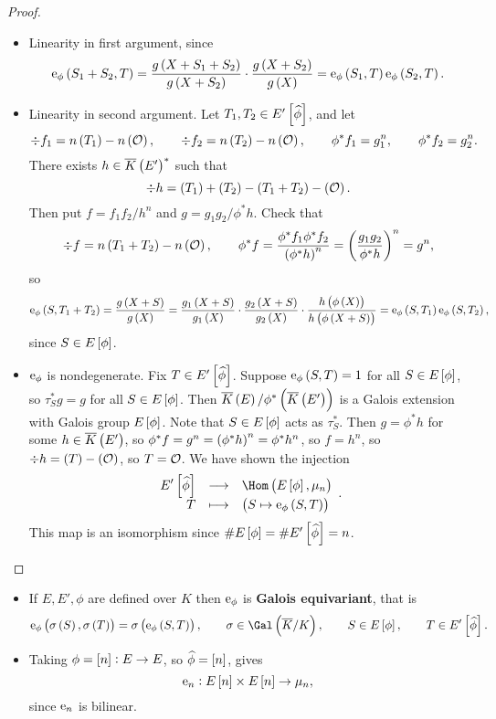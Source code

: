 \begin{proof}
\hfill
\begin{itemize}
\item Linearity in first argument, since
$$ \e_\phi\br{S_1 + S_2, T} = \dfrac{g\br{X + S_1 + S_2}}{g\br{X + S_2}} \cdot \dfrac{g\br{X + S_2}}{g\br{X}} = \e_\phi\br{S_1, T}\e_\phi\br{S_2, T}. $$

\pagebreak

\item Linearity in second argument. Let $ T_1, T_2 \in E'\sbr{\widehat{\phi}} $, and let
$$ \div f_1 = n\br{T_1} - n\br{\OOO}, \qquad \div f_2 = n\br{T_2} - n\br{\OOO}, \qquad \phi^*f_1 = g_1^n, \qquad \phi^*f_2 = g_2^n. $$
There exists $ h \in \overline{K}\br{E'}^* $ such that
$$ \div h = \br{T_1} + \br{T_2} - \br{T_1 + T_2} - \br{\OOO}. $$
Then put $ f = f_1f_2 / h^n $ and $ g = g_1g_2 / \phi^*h $. Check that
$$ \div f = n\br{T_1 + T_2} - n\br{\OOO}, \qquad \phi^*f = \dfrac{\phi^*f_1\phi^*f_2}{\br{\phi^*h}^n} = \br{\dfrac{g_1g_2}{\phi^*h}}^n = g^n, $$
so
$$ \e_\phi\br{S, T_1 + T_2} = \dfrac{g\br{X + S}}{g\br{X}} = \dfrac{g_1\br{X + S}}{g_1\br{X}} \cdot \dfrac{g_2\br{X + S}}{g_2\br{X}} \cdot \dfrac{h\br{\phi\br{X}}}{h\br{\phi\br{X + S}}} = \e_\phi\br{S, T_1}\e_\phi\br{S, T_2}, $$
since $ S \in E\sbr{\phi} $.
\item $ \mathrm{e}_\phi $ is nondegenerate. Fix $ T \in E'\sbr{\widehat{\phi}} $. Suppose $ \e_\phi\br{S, T} = 1 $ for all $ S \in E\sbr{\phi} $, so $ \tau_S^*g = g $ for all $ S \in E\sbr{\phi} $. Then $ \overline{K}\br{E} / \phi^*\br{\overline{K}\br{E'}} $ is a Galois extension with Galois group $ E\sbr{\phi} $. Note that $ S \in E\sbr{\phi} $ acts as $ \tau_S^* $. Then $ g = \phi^*h $ for some $ h \in \overline{K}\br{E'} $, so $ \phi^*f = g^n = \br{\phi^*h}^n = \phi^*h^n $, so $ f = h^n $, so $ \div h = \br{T} - \br{\OOO} $, so $ T = \mathcal{O} $. We have shown the injection
$$ \function{E'\sbr{\widehat{\phi}}}{\Hom\br{E\sbr{\phi}, \mu_n}}{T}{\br{S \mapsto \e_\phi\br{S, T}}}. $$
This map is an isomorphism since $ \#E\sbr{\phi} = \#E'\sbr{\widehat{\phi}} = n $.
\end{itemize}
\end{proof}

\begin{remark*}
\hfill
\begin{itemize}
\item If $ E, E', \phi $ are defined over $ K $ then $ \mathrm{e}_\phi $ is \textbf{Galois equivariant}, that is
$$ \e_\phi\br{\sigma\br{S}, \sigma\br{T}} = \sigma\br{\e_\phi\br{S, T}}, \qquad \sigma \in \Gal\br{\overline{K} / K}, \qquad S \in E\sbr{\phi}, \qquad T \in E'\sbr{\widehat{\phi}}. $$
\item Taking $ \phi = \sbr{n} : E \to E $, so $ \widehat{\phi} = \sbr{n} $, gives
$$ \e_n : E\sbr{n} \times E\sbr{n} \to \mu_n, $$
since $ \mathrm{e}_n $ is bilinear.
\end{itemize}
\end{remark*}

